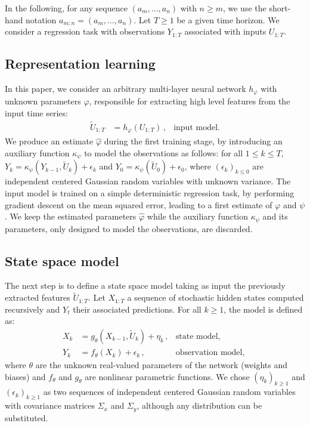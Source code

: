 \documentclass[conference]{IEEEtran}
\begin{document}
In the following, for any sequence $(a_m,\ldots, a_n)$ with $n\geq m$, we use the short-hand notation $a_{m:n} = (a_m,\ldots, a_n)$.
Let $T\ge 1$ be a given time horizon.
We consider a regression task with observations $Y_{1:T}$ associated with inputs $U_{1:T}$.

\subsection{Representation learning}%
In this paper, we consider an arbitrary multi-layer neural network $h_\varphi$ with unknown parameters $\varphi$, responsible for extracting high level features from the input time series:
\begin{align*}
	\widetilde U_{1:T} & = h_\varphi(U_{1:T})\,, & \text{input model.}
\end{align*}
We produce an estimate $\hat \varphi$ during the first training stage, by introducing an auxiliary function $\kappa_\psi$ to model the observations as follows: for all $1 \leq k \leq T$, $Y_k = \kappa_\psi(Y_{k-1}, \widetilde U_k) + \epsilon_k$ and $Y_0 = \kappa_\psi(\widetilde U_0) + \epsilon_0$, where $(\epsilon_k)_{k\leq 0}$ are independent centered Gaussian random variables with unknown variance.
The input model is trained on a simple deterministic regression task, by performing gradient descent on the mean squared error, leading to a first estimate of $\varphi$ and $\psi$.
We keep the estimated parameters $\hat \varphi$ while the auxiliary function $\kappa_\psi$ and its parameters, only designed to model the observations, are discarded.

\subsection{State space model}
\label{sub:proposed_architecture}
The next step is to define  a state space model taking as input the previously extracted features $\widetilde U_{1:T}$.
Let $X_{1:T}$ a sequence of stochastic hidden states computed recursively and $Y_t$ their associated predictions.
For all $k \geq 1$, the model is defined as:
\begin{align*}
	X_k & = g_\theta(X_{k-1}, \widetilde U_k) + \eta_k\,, & \text{state model, }       \\
	Y_k & = f_\theta(X_k) + \epsilon_k\,,                 & \text{observation model, }
\end{align*}
where $\theta$ are the unknown real-valued parameters of the network (weights and biases) and $f_\theta$ and $g_\theta$ are nonlinear parametric functions.
We chose $(\eta_k)_{k\geq 1}$ and $(\epsilon_k)_{k\geq 1}$ as two sequences of independent centered Gaussian random variables with covariance matrices $\Sigma_x$ and $\Sigma_y$, although any distribution can be substituted.
\end{document}
